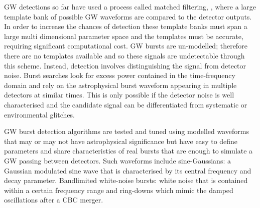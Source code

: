\documentclass[12pt]{iopart}
\newcommand{\chris}[1]{\textbf{\textcolor{green}{CHRIS: #1}}}
\begin{document}
GW detections so far have used a process called matched filtering, \cite{Owen1998}, where a large template bank of possible GW waveforms are compared to the detector outputs. In order to increase the chances of detection these template banks must span a large multi dimensional parameter space and the templates must be accurate, requiring significant computational cost.  GW bursts are un-modelled; therefore there are no templates available and so these signals are undetectable through this scheme. Instead, detection involves distinguishing
the signal from detector noise. Burst searches look for excess power contained in the time-frequency domain and rely on the astrophysical burst waveform appearing in multiple detectors at similar times. This is only possible if the detector noise is
well characterised and the candidate signal can be differentiated from
systematic or environmental glitches. 

%
\ac{GW} burst detection algorithms \cite{Klimenko_2008, Aso_2008} are tested and tuned using modelled waveforms that may
or may not have astrophysical significance but have easy to define parameters
and share characteristics of real bursts that are enough to simulate a \ac{GW} passing between detectors. Such waveforms include sine-Gaussians: a Gaussian modulated sine wave that is characterised by its central frequency and decay parameter. Bandlimited white-noise bursts: white noise that is contained within a certain frequency range and ring-downs which mimic the damped oscillations after a CBC merger.

%
\end{document}
